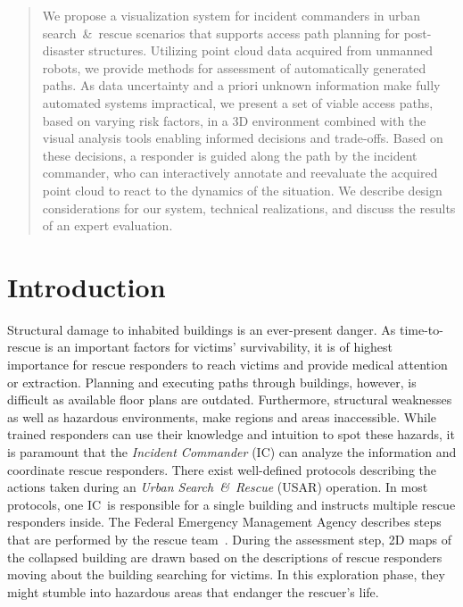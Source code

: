 \documentclass{egpubl}
\def\IC{IC}
\begin{document}
\maketitle

\begin{abstract}
We propose a visualization system for incident commanders in urban search~\&~rescue scenarios that supports access path planning for post-disaster structures. Utilizing point cloud data acquired from unmanned robots, we provide methods for assessment of automatically generated paths. As data uncertainty and a priori unknown information make fully automated systems impractical, we present a set of viable access paths, based on varying risk factors, in a 3D environment combined with the visual analysis tools enabling informed decisions and trade-offs. Based on these decisions, a responder is guided along the path by the incident commander, who can interactively annotate and reevaluate the acquired point cloud to react to the dynamics of the situation. We describe design considerations for our system, technical realizations, and discuss the results of an expert evaluation.

\begin{classification}
\end{classification}


\end{abstract}

\section{Introduction}

Structural damage to inhabited buildings is an ever-present danger. As time-to-rescue is an important factors for victims' survivability, it is of highest importance for rescue responders to reach victims and provide medical attention or extraction. Planning and executing paths through buildings, however, is difficult as available floor plans are outdated. Furthermore, structural weaknesses as well as hazardous environments, make regions and areas inaccessible. While trained responders can use their knowledge and intuition to spot these hazards, it is paramount that the \emph{Incident Commander} (IC) can analyze the information and coordinate rescue responders. There exist well-defined protocols describing the actions taken during an \emph{Urban Search~\&~Rescue} (USAR) operation. In most protocols, one \IC\ is responsible for a single building and instructs multiple rescue responders inside. The Federal Emergency Management Agency describes steps that are performed by the rescue team~\cite{fema08}. During the assessment step, 2D maps of the collapsed building are drawn based on the descriptions of rescue responders moving about the building searching for victims. In this exploration phase, they might stumble into hazardous areas that endanger the rescuer's life.
\end{document}
